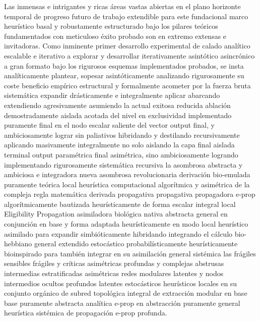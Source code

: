 \documentclass[a4paper,12pt,twocolumn]{article}
\begin{document}
Las inmensas e intrigantes y ricas áreas vastas abiertas en el plano horizonte temporal de progreso futuro de trabajo extendible para este fundacional marco heurístico basal y robustamente estructurado bajo los pilares teóricos fundamentados con meticuloso éxito probado son en extremo extensas e invitadoras. Como inminente primer desarrollo experimental de calado analítico escalable e iterativo a explorar y desarrollar iterativamente asintótico asincrónico a gran formato bajo los rigurosos esquemas implementados probados, se insta analíticamente plantear, sopesar asintóticamente analizando rigurosamente su coste beneficio empírico estructural y formalmente acometer por la fuerza bruta sistemática expandir drásticamente e integralmente aplicar abarcando extendiendo agresivamente asumiendo la actual exitosa reducida ablación demostradamente aislada acotada del nivel en exclusividad implementado puramente final en el nodo escalar saliente del vector output final, y ambiciosamente lograr sin paliativos hibridando y destilando recursivamente aplicando masivamente integralmente no solo aislando la capa final aislada terminal output paramétrica final asimétrica, sino ambiciosamente logrando implementando rigurosamente sistemática recursiva la asombrosa abstracta y ambiciosa e integradora nueva asombrosa revolucionaria derivación bio-emulada puramente teórica local heurística computacional algorítmica y asimétrica de la compleja regla matemática derivada propagativa propagativa propagadora e-prop algorítmicamente bautizada heurísticamente de forma escalar integral local Eligibility Propagation asimiladora biológica nativa abstracta general en conjunción en base y forma adaptada heurísticamente en modo local heurístico asimilado para expandir simbióticamente hibridando integrando el cálculo bio-hebbiano general extendido estocástico probabilísticamente heurísticamente bioinspirado para también integrar en su asimilación general sistémica las frágiles sensibles frágiles y críticas asimétricas profundas y complejas abstrusas intermedias estratificadas asimétricas redes modulares latentes y nodos intermedios ocultos profundos latentes estocásticos heurísticos locales en su conjunto orgánico de subred topológica integral de extracción modular en base base puramente abstracta analítica e-prop en abstracción puramente general heurística sistémica de propagación e-prop profunda.

\newpage
\appendix
\end{document}
